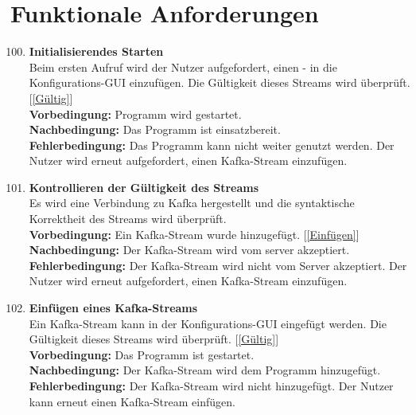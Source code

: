 \chapter{Funktionale Anforderungen}
\begin{enumerate}[label=\textbf{PF\arabic{enumi}0}]
	\setcounter{enumi}{99}
	\section{Pflichtanforderungen}
	\subsection{Server}

	\item \textbf{Initialisierendes Starten}\\
		Beim ersten Aufruf wird der Nutzer aufgefordert, einen - in die Konfigurations-GUI einzufügen. Die Gültigkeit dieses Streams wird überprüft. [\ref{Gültig}]\\
		\textbf{Vorbedingung:} Programm wird gestartet.\\
		\textbf{Nachbedingung:} Das Programm ist einsatzbereit.\\
		\textbf{Fehlerbedingung:} Das Programm kann nicht weiter genutzt werden. Der Nutzer wird erneut aufgefordert, einen Kafka-Stream einzufügen.
	
	\item \textbf{Kontrollieren der Gültigkeit des Streams} \label{Gültig}\\
		Es wird eine Verbindung zu Kafka hergestellt und die syntaktische Korrektheit des Streams wird überprüft.\\
		\textbf{Vorbedingung:} Ein Kafka-Stream wurde hinzugefügt. [\ref{Einfügen}]\\
		\textbf{Nachbedingung:} Der Kafka-Stream wird vom \gls{server} akzeptiert.\\
		\textbf{Fehlerbedingung:} Der Kafka-Stream wird nicht vom Server akzeptiert. Der Nutzer wird erneut aufgefordert, einen Kafka-Stream einzufügen.
	
	\item \textbf{Einfügen eines Kafka-Streams} \label{Einfügen}\\
		Ein Kafka-Stream kann in der Konfigurations-GUI eingefügt werden. Die Gültigkeit dieses Streams wird überprüft. [\ref{Gültig}]\\
		\textbf{Vorbedingung:} Das Programm ist gestartet.\\
		\textbf{Nachbedingung:} Der Kafka-Stream wird dem Programm hinzugefügt.\\
		\textbf{Fehlerbedingung:} Der Kafka-Stream wird nicht hinzugefügt. Der Nutzer kann erneut einen Kafka-Stream einfügen.
		

\end{enumerate}
